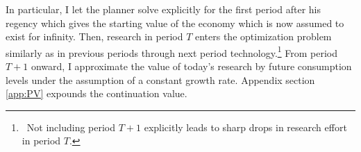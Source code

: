 
In particular, I let the planner solve explicitly for the first period after his regency which gives the starting value of the economy which is now assumed to exist for infinity. 
Then, research in period $T$ enters the optimization problem similarly as in previous periods through next period technology.\footnote{\ Not including period $T+1$ explicitly leads to sharp drops in research effort in period $T$. }  From period $T+1$ onward, I approximate the value of today's research by future consumption levels under the assumption of a constant growth rate.  Appendix section \ref{app:PV} expounds  the continuation value.

